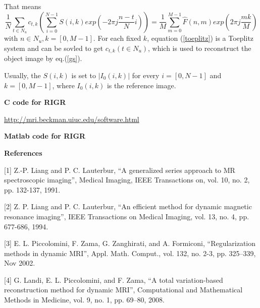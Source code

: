 \documentclass[12pt,a4paper]{article}
\begin{document}
\begin{CJK}{UTF8}{songti}
That means
\begin{equation}
\frac{1}{N} \sum_{t \in N_u}c_{t,k} (\sum_{i=0}^{N-1}S(i,k)exp(-2 \pi j\frac{n-t}{N}i))=\frac{1}{M} \sum_{m=0}^{M-1}\hat{F}(n,m)exp(2 \pi j \frac{mk}{M})
\label{toeplitz}
\end{equation}
with $n \in N_u, k=[0, M-1]$. For each fixed $k$, equation (\ref{toeplitz})  is a Toeplitz system and can be sovled to get $c_{t,k}(t \in N_u)$, which is used to reconstruct the object image by eq.(\ref{gs}).

Usually, the $S(i, k)$ is set to $|I_0(i,k)|$ for every $i=[0,N-1]$ and
$k=[0,M-1]$, where $I_0(i,k)$ is the reference image.



\medskip

\textbf{C code for RIGR}

\url{http://mri.beckman.uiuc.edu/software.html}

\textbf{Matlab code for RIGR}



%

\textbf{References}

[1] Z.-P. Liang and P. C. Lauterbur, “A generalized series approach to MR spectroscopic imaging”, Medical Imaging, IEEE Transactions on, vol. 10, no. 2, pp. 132-137, 1991.

[2] Z. P. Liang and P. C. Lauterbur, “An efficient method for dynamic magnetic resonance imaging”, IEEE Transactions on Medical Imaging, vol. 13, no. 4, pp. 677-686, 1994.

[3] E. L. Piccolomini, F. Zama, G. Zanghirati, and A. Formiconi, “Regularization methods in dynamic MRI”, Appl. Math. Comput., vol. 132, no. 2-3, pp. 325–339, Nov 2002.

[4] G. Landi, E. L. Piccolomini, and F. Zama, “A total variation-based reconstruction method for dynamic MRI”, Computational and Mathematical Methods in Medicine, vol. 9, no. 1, pp. 69–80, 2008.

%
%

\end{CJK}
\end{document}
